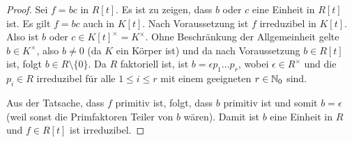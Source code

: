 \documentclass[12pt,a4paper]{scrartcl}
\begin{document}
\begin{proof}
	Sei $f = bc$ in $R[t]$. Es ist zu zeigen, dass $b$ oder $c$ eine Einheit in $R[t]$ ist. Es gilt $f = bc$ auch in $K[t]$. Nach Voraussetzung ist $f$ irreduzibel in $K[t]$. Also ist $b$ oder $c\in K[t]^{\times} = K^{\times}$. Ohne Beschränkung der Allgemeinheit gelte $b\in K^{\times}$, also $b \neq 0$ (da $K$ ein Körper ist) und da nach Voraussetzung $b\in R[t]$ ist, folgt $b\in R\setminus\{0\}$. Da $R$ faktoriell ist, ist $b = \epsilon p_1\dots p_r$, wobei $\epsilon\in R^{\times}$ und die $p_i\in R$ irreduzibel für alle $1\le i \le r$ mit einem geeigneten $r\in\mathbb N_0$ sind.
	
	Aus der Tatsache, dass $f$ primitiv ist, folgt, dass $b$ primitiv ist und somit $b = \epsilon$ (weil sonst die Primfaktoren Teiler von $b$ wären). Damit ist $b$ eine Einheit in $R$ und $f\in R[t]$ ist irreduzibel.
\end{proof}
\end{document}
